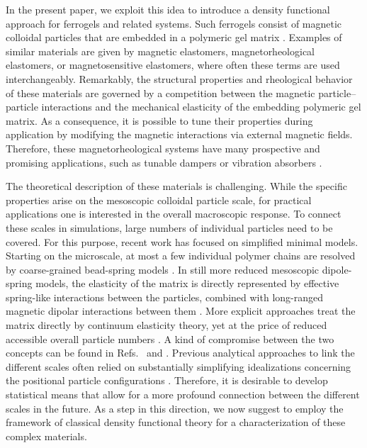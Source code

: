 \documentclass[aps,pre,twocolumn,superscriptaddress,nofootinbib]{revtex4}
\begin{document}
In the present paper, we exploit this idea to introduce a density functional approach for ferrogels and related systems.
Such ferrogels consist of magnetic colloidal particles that are embedded in a polymeric gel matrix \cite{filipcsei2007magnetic,ilg2013stimuli,menzel2015tuned, odenbach2016microstructure,lopez2016mechanics}. 
Examples of similar materials are given by magnetic elastomers, magnetorheological elastomers, or magnetosensitive elastomers, where often these terms are used interchangeably. 
Remarkably, the structural properties and rheological behavior of these materials are governed by a competition between the magnetic particle--particle interactions and the mechanical elasticity of the embedding polymeric gel matrix. 
As a consequence, it is possible to tune their properties during application by modifying the magnetic interactions via external magnetic fields. 
Therefore, these magnetorheological systems have many prospective and promising applications, such as tunable dampers \cite{sun2008study} or vibration absorbers \cite{deng2006development}. 

The theoretical description of these materials is challenging. 
While the specific properties arise on the mesoscopic colloidal particle scale, for practical applications one is interested in the overall macroscopic response.
To connect these scales in simulations, large numbers of individual particles need to be covered. 
For this purpose, recent work has focused on simplified minimal models. 
Starting on the microscale, at most a few individual polymer chains are resolved by coarse-grained bead-spring models \cite{weeber2012deformation,ryzhkov2015coarse,weeber2015ferrogels}. 
In still more reduced mesoscopic dipole-spring models, the elasticity of the matrix is directly represented by effective spring-like interactions between the particles, combined with long-ranged magnetic dipolar interactions between them \cite{annunziata2013hardening,pessot2014structural,tarama2014tunable,ivaneyko2015dynamic,pessot2016dynamic}. 
More explicit approaches treat the matrix directly by continuum elasticity theory, yet at the price of reduced accessible overall particle numbers \cite{han2013field,cremer2015tailoring,cremer2016superelastic,metsch2016numerical}. A kind of compromise between the two concepts can be found in Refs.~ and . 
Previous analytical approaches to link the different scales often relied on substantially simplifying idealizations concerning the positional particle configurations \cite{ivaneyko2011magneto,menzel2014bridging,zubarev2016towards}. 
Therefore, it is desirable to develop statistical means that allow for a more profound connection between the different scales in the future. 
As a step in this direction, we now suggest to employ the framework of classical density functional theory for a characterization of these complex materials.
\end{document}

